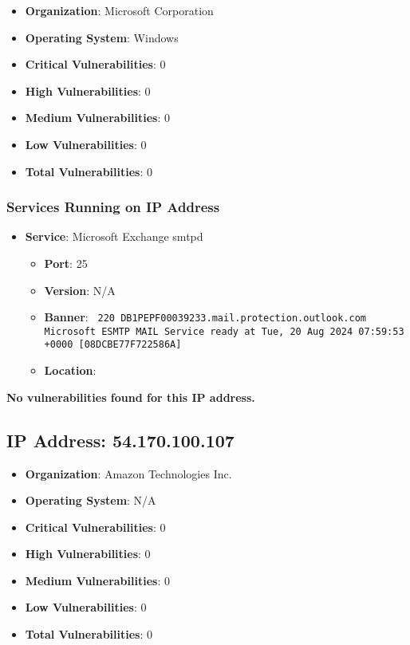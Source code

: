 \documentclass{article}
\begin{document}
\begin{itemize}
    \item \textbf{Organization}: Microsoft Corporation
    \item \textbf{Operating System}:  Windows 
    \item \textbf{Critical Vulnerabilities}: 0
    \item \textbf{High Vulnerabilities}: 0
    \item \textbf{Medium Vulnerabilities}: 0
    \item \textbf{Low Vulnerabilities}: 0
    \item \textbf{Total Vulnerabilities}: 0
\end{itemize}

\subsubsection*{Services Running on IP Address}

\begin{itemize}
    
        \item \textbf{Service}: Microsoft Exchange smtpd
        \begin{itemize}
            \item \textbf{Port}: 25
            \item \textbf{Version}:  N/A 
            \item \textbf{Banner}: \texttt{
                220 DB1PEPF00039233.mail.protection.outlook.com Microsoft ESMTP MAIL Service ready at Tue, 20 Aug 2024 07:59:53 +0000 [08DCBE77F722586A]
            }
            \item \textbf{Location}: \href{  }{  }
        \end{itemize}
    
\end{itemize}


\textbf{No vulnerabilities found for this IP address.}




\clearpage



\subsection*{IP Address: 54.170.100.107}

\begin{itemize}
    \item \textbf{Organization}: Amazon Technologies Inc.
    \item \textbf{Operating System}:  N/A 
    \item \textbf{Critical Vulnerabilities}: 0
    \item \textbf{High Vulnerabilities}: 0
    \item \textbf{Medium Vulnerabilities}: 0
    \item \textbf{Low Vulnerabilities}: 0
    \item \textbf{Total Vulnerabilities}: 0
\end{itemize}
\end{document}
